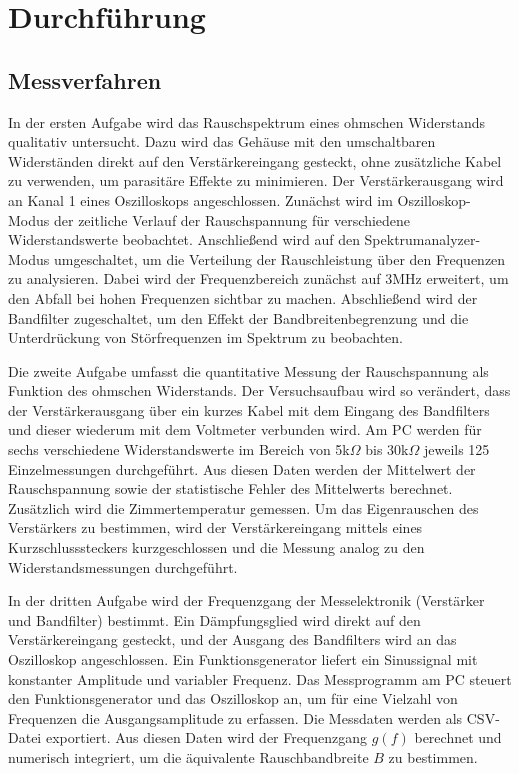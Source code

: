 \chapter{Durchführung} \label{ch:Durchfuehrung}

\section{Messverfahren}
\label{sec:Messverfahren}
In der ersten Aufgabe wird das Rauschspektrum eines ohmschen Widerstands qualitativ untersucht. Dazu wird das Gehäuse mit den umschaltbaren Widerständen direkt auf den Verstärkereingang gesteckt, ohne zusätzliche Kabel zu verwenden, um parasitäre Effekte zu minimieren. Der Verstärkerausgang wird an Kanal 1 eines Oszilloskops angeschlossen. Zunächst wird im Oszilloskop-Modus der zeitliche Verlauf der Rauschspannung für verschiedene Widerstandswerte beobachtet. Anschließend wird auf den Spektrumanalyzer-Modus umgeschaltet, um die Verteilung der Rauschleistung über den Frequenzen zu analysieren. Dabei wird der Frequenzbereich zunächst auf 3MHz erweitert, um den Abfall bei hohen Frequenzen sichtbar zu machen. Abschließend wird der Bandfilter zugeschaltet, um den Effekt der Bandbreitenbegrenzung und die Unterdrückung von Störfrequenzen im Spektrum zu beobachten.


Die zweite Aufgabe umfasst die quantitative Messung der Rauschspannung als Funktion des ohmschen Widerstands. Der Versuchsaufbau wird so verändert, dass der Verstärkerausgang über ein kurzes Kabel mit dem Eingang des Bandfilters und dieser wiederum mit dem Voltmeter verbunden wird. Am PC werden für sechs verschiedene Widerstandswerte im Bereich von 5k$\Omega$ bis 30k$\Omega$ jeweils 125 Einzelmessungen durchgeführt. Aus diesen Daten werden der Mittelwert der Rauschspannung sowie der statistische Fehler des Mittelwerts berechnet. Zusätzlich wird die Zimmertemperatur gemessen. Um das Eigenrauschen des Verstärkers zu bestimmen, wird der Verstärkereingang mittels eines Kurzschlusssteckers kurzgeschlossen und die Messung analog zu den Widerstandsmessungen durchgeführt.

In der dritten Aufgabe wird der Frequenzgang der Messelektronik (Verstärker und Bandfilter) bestimmt. Ein Dämpfungsglied wird direkt auf den Verstärkereingang gesteckt, und der Ausgang des Bandfilters wird an das Oszilloskop angeschlossen. Ein Funktionsgenerator liefert ein Sinussignal mit konstanter Amplitude und variabler Frequenz. Das Messprogramm am PC steuert den Funktionsgenerator und das Oszilloskop an, um für eine Vielzahl von Frequenzen die Ausgangsamplitude zu erfassen. Die Messdaten werden als CSV-Datei exportiert. Aus diesen Daten wird der Frequenzgang $g(f)$ berechnet und numerisch integriert, um die äquivalente Rauschbandbreite $B$ zu bestimmen.

